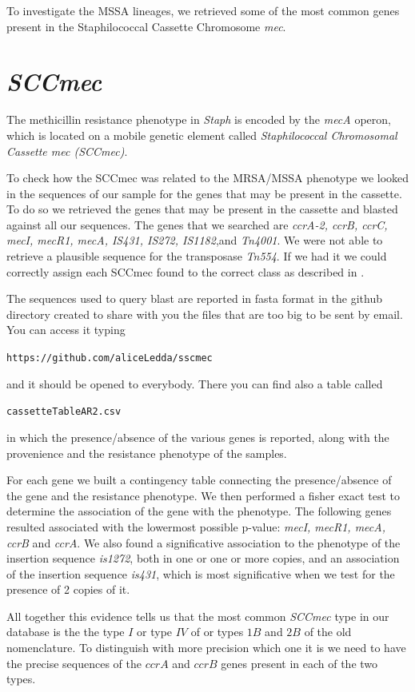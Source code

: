 \documentclass[12pt,a4paper]{article}
\begin{document}
To investigate the MSSA lineages, we retrieved some of the most common genes present in the Staphilococcal Cassette Chromosome \textit{mec}.

\section{\textit{SCCmec}}
The methicillin resistance phenotype in \textit{Staph} is encoded by the \textit{mecA} operon, which is located on a mobile genetic element called \textit{Staphilococcal Chromosomal Cassette mec (SCCmec)}.

To check how the SCCmec was related to the MRSA/MSSA phenotype we looked in the sequences of our sample for the genes that may be present in the cassette. To do so we retrieved the genes that may be present in the cassette and blasted against all our sequences.
The genes that we searched are \textit{ccrA-2, ccrB, ccrC, mecI, mecR1, mecA, IS431, IS272, IS1182},and \textit{Tn4001}. We were not able to retrieve a plausible sequence for the transposase \textit{Tn554}. If we had it we could correctly assign each SCCmec found to the correct class as described in \cite{sscmec}.
 
The sequences used to query blast are reported in fasta format in the github directory created to share with you the files that are too big to be sent by email. You can access it typing 

\verb!https://github.com/aliceLedda/sscmec!

and it should be opened to everybody.
There you can find also a table called  

\verb!cassetteTableAR2.csv! 

in which the presence/absence of the various genes is reported, along with the provenience and the resistance phenotype of the samples.

For each gene we built a contingency table connecting the presence/absence of the gene and the resistance phenotype. We then performed a fisher exact test to determine the association of the gene with the phenotype. The following genes resulted associated with the lowermost possible p-value: \textit{mecI, mecR1, mecA, ccrB} and \textit{ccrA}. We also found a significative association to the phenotype of the insertion sequence \textit{is1272}, both in one or one or more copies, and an association of the insertion sequence \textit{is431}, which is most significative when we test for the presence of 2 copies of it.

All together this evidence tells us that the most common \textit{SCCmec} type in our database is the the type $I$ or type $IV$ of \cite{sscmec} or types $1B$ and $2B$ of the old nomenclature. To distinguish with more precision which one it is we need to have the precise sequences of the $ccrA$ and $ccrB$ genes present in each of the two types. 
\end{document}
